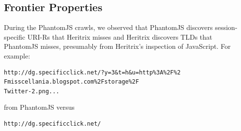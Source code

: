\documentclass{ipres_proc_article-sp}
\begin{document}




\subsection{Frontier Properties}
\label{frontierProp}
During the PhantomJS crawls, we observed that PhantomJS discovers session-specific URI-Rs that Heritrix misses and Heritrix discovers TLDs that PhantomJS misses, presumably from Heritrix's inspection of JavaScript. For example:  
\begin{verbatim}
http://dg.specificclick.net/?y=3&t=h&u=http%3A%2F%2
Fmisscellania.blogspot.com%2Fstorage%2F
Twitter-2.png...
\end{verbatim}
\noindent from PhantomJS versus
\begin{verbatim}
http://dg.specificclick.net/
\end{verbatim}
\end{document}

